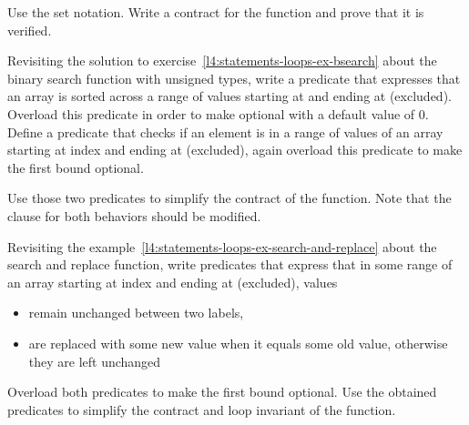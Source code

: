Use the set notation. Write a contract for the function and prove that it is
verified.




\label{l4:acsl-properties-predicates-ex-bsearch}


Revisiting the solution to
exercise~\ref{l4:statements-loops-ex-bsearch} about the binary search function
with unsigned types, write a predicate that expresses that an array is sorted across
a range of values starting at  and ending at 
(excluded). Overload this predicate in order to make  optional
with a default value of $0$. Define a predicate that checks if an element is in
a range of values of an array starting at index  and ending at
 (excluded), again overload this predicate to make the first
bound optional.

Use those two predicates to simplify the contract of the function. Note that
the  clause for both behaviors should be modified.






Revisiting the example~\ref{l4:statements-loops-ex-search-and-replace} about
the search and replace function, write predicates that express that in some range
of an array starting at index  and ending at 
(excluded), values

\begin{itemize}
\item remain unchanged between two labels,
\item are replaced with some new value when it equals some old value,
  otherwise they are left unchanged
\end{itemize}

Overload both predicates to make the first bound optional. Use the obtained
predicates to simplify the contract and loop invariant of the function.


